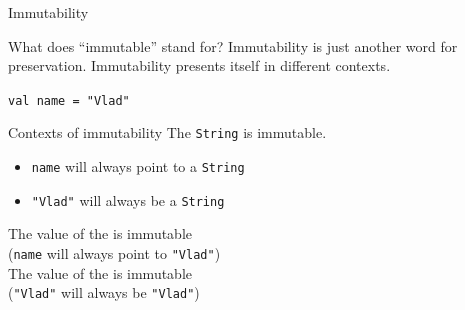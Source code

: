 \begin{frame}[fragile]{Immutability}
\begin{block}{What does ``immutable'' stand for?}
Immutability is just another word for preservation. Immutability presents itself
in different contexts.
\end{block}
\pause
\begin{center}
\lstinline!val name = "Vlad"!
\end{center}
\pause
\begin{block}{Contexts of immutability}
The  \lstinline!String! is immutable.\\
\begin{itemize}
\item \lstinline!name! will always point to a \lstinline!String!
\item \lstinline!"Vlad"! will always be a \lstinline!String!
\end{itemize}
\pause
The value of the  is immutable\\
(\lstinline!name! will always point to \lstinline!"Vlad"!)\\
\pause
The value of the  is immutable\\
(\lstinline!"Vlad"! will always be \lstinline!"Vlad"!)
\end{block}
\end{frame}

